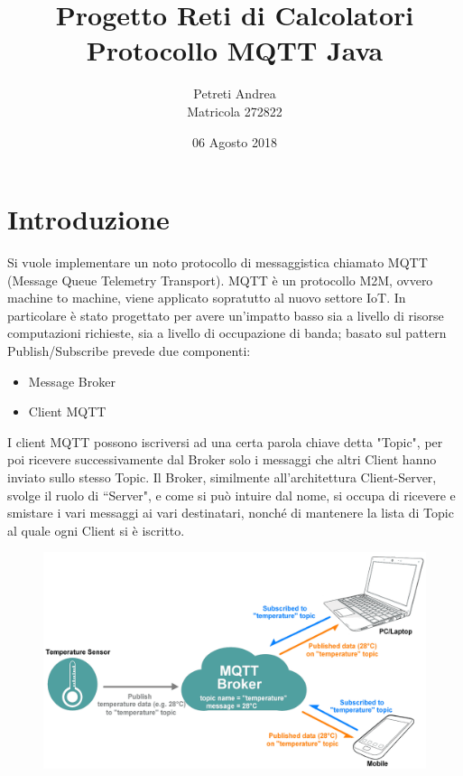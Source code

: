 \documentclass{article}
\title{Progetto Reti di Calcolatori \\[5em] 
\large Protocollo MQTT Java}
\author{Petreti Andrea\\\small Matricola 272822}
\date{06 Agosto 2018}
\begin{document}
\maketitle
\thispagestyle{empty}

\newpage 

\renewcommand{\contentsname}{Indice}

\tableofcontents

\newpage

\section{Introduzione}
Si vuole implementare un noto protocollo di messaggistica chiamato MQTT (Message Queue Telemetry Transport). MQTT è un protocollo M2M, ovvero machine to machine, viene applicato sopratutto al nuovo settore IoT. In particolare è stato progettato per avere un'impatto basso sia a livello di risorse computazioni richieste, sia a livello di occupazione di banda; basato sul pattern Publish/Subscribe prevede due componenti:
\begin{itemize}
	\item Message Broker
	\item Client MQTT
\end{itemize}
I client MQTT possono iscriversi ad una certa parola chiave detta "Topic", per poi ricevere successivamente dal Broker solo i messaggi che altri Client hanno inviato sullo stesso Topic. Il Broker, similmente all'architettura Client-Server, svolge il ruolo di ``Server", e come si può intuire dal nome, si occupa di ricevere e smistare i vari messaggi ai vari destinatari, nonché di mantenere la lista di Topic al quale ogni Client si è iscritto.

\begin{figure}[htbp]
	\centerline{
		\includegraphics[scale=0.2]{immagini/broker_client_img.png}
	}
\end{figure}
\end{document}
